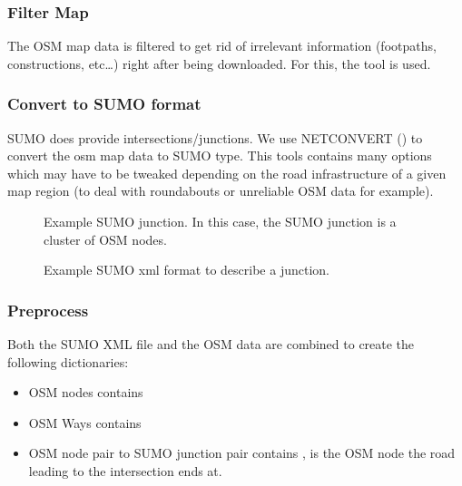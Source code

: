\documentclass[letterpaper,10pt,english]{sphinxmanual}
\begin{document}
\subsubsection{Filter Map}
\label{\detokenize{microservices/map_preprocessing/map_preprocessing:filter-map}}
The OSM map data is filtered to get rid of irrelevant information (footpaths, constructions, etc…) right after being downloaded.
For this, the tool  is used.


\subsubsection{Convert to SUMO format}
\label{\detokenize{microservices/map_preprocessing/map_preprocessing:convert-to-sumo-format}}
SUMO does provide intersections/junctions.
We use NETCONVERT () to convert the osm map data to SUMO type.
This tools contains many options which may have to be tweaked depending on the road infrastructure of a given map region (to deal with roundabouts or unreliable OSM data for example).

\begin{figure}[htbp]
\centering
\capstart

\noindent{}
\caption{Example SUMO junction. In this case, the SUMO junction is a cluster of OSM nodes.}\label{\detokenize{microservices/map_preprocessing/map_preprocessing:id3}}\end{figure}

\begin{figure}[htbp]
\centering
\capstart

\noindent{}
\caption{Example SUMO xml format to describe a junction.}\label{\detokenize{microservices/map_preprocessing/map_preprocessing:id4}}\end{figure}


\subsubsection{Preprocess}
\label{\detokenize{microservices/map_preprocessing/map_preprocessing:preprocess}}
Both the SUMO XML file and the OSM data are combined to create the following dictionaries:
\begin{itemize}
\item {} 
OSM nodes contains 

\item {} 
OSM Ways contains 

\item {} 
OSM node pair to SUMO junction pair contains ,  is the OSM node the road leading to the intersection ends at.

\end{itemize}
\end{document}
